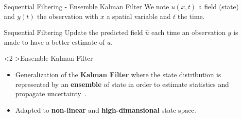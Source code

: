 \documentclass[aspectratio=169]{beamer} %
\begin{document}
\begin{frame}{Sequential Filtering - Ensemble Kalman Filter}
    \small
    We note $u(x, t)$ a field (state) and $y(t)$ the observation with $x$ a spatial variable and $t$ the time.
    \begin{block}{Sequential Filtering}
        Update the predicted field $\hat u$ each time an observation $y$ is made to have a better estimate of $u$.
    \end{block}
    \vfill
    \begin{block}<2->{Ensemble Kalman Filter}
        \begin{itemize}
            \item Generalization of the \textbf{Kalman Filter} where the state distribution is represented by an \textbf{ensemble} of state in order to estimate statistics and propagate uncertainty~\cite{evensen_sequential_1994}.
            \item Adapted to \textbf{non-linear} and \textbf{high-dimansional} state space.
        \end{itemize}
    \end{block}
\end{frame}
\end{document}
